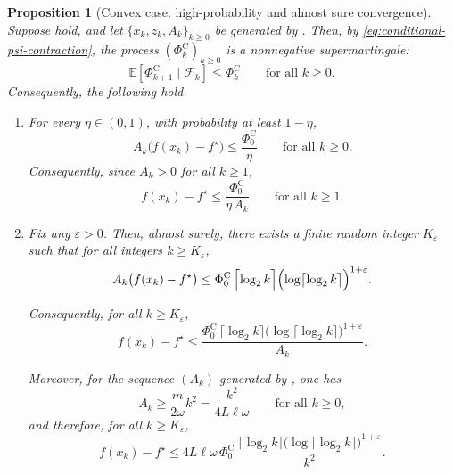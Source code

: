 \documentclass[10pt]{article}
\newtheorem{proposition}[proposition]{Proposition}
\newcommand{\E}{\mathbb{E}}
\begin{document}
\begin{proposition}[Convex case: high-probability and almost sure convergence]
\label{prop:convex-as}
Suppose  hold, and let
\(\{x_k,z_k,A_k\}_{k\ge 0}\) be generated by .
Then, by \eqref{eq:conditional-psi-contraction}, the process
\((\Phi_k^{\mathrm C})_{k\ge 0}\) is a nonnegative supermartingale:
\[
\E[\Phi_{k+1}^{\mathrm C}\mid \mathcal F_k]\le \Phi_k^{\mathrm C}
\qquad\text{for all }k\ge 0.
\]
Consequently, the following hold.

\begin{enumerate}
\item[(i)] For every \(\eta\in(0,1)\), with probability at least \(1-\eta\),
\begin{equation}
\label{eq:convex-hp-AN}
A_k\bigl(f(x_k)-f^\star\bigr)\le \frac{\Phi_0^{\mathrm C}}{\eta}
\qquad\text{for all }k\ge 0.
\end{equation}
Consequently, since \(A_k>0\) for all \(k\ge 1\),
\begin{equation}
\label{eq:convex-hp-gap}
f(x_k)-f^\star\le \frac{\Phi_0^{\mathrm C}}{\eta\,A_k}
\qquad\text{for all }k\ge 1.
\end{equation}

\item[(ii)] Fix any \(\varepsilon>0\).
Then, almost surely, there exists a finite random integer \(K_\varepsilon\) such that for all integers \(k\ge K_\varepsilon\),
\begin{equation}
\label{eq:convex-as-AN}
A_k\bigl(f(x_k)-f^\star\bigr)
\le
\Phi_0^{\mathrm C}\,
\Bigl\lceil \log_2 k \Bigr\rceil
\Bigl(\log \bigl\lceil \log_2 k \bigr\rceil \Bigr)^{1+\varepsilon}.
\end{equation}

Consequently, for all \(k\ge K_\varepsilon\),
\begin{equation}
\label{eq:convex-as-gap}
f(x_k)-f^\star
\le
\frac{
\Phi_0^{\mathrm C}\,
\bigl\lceil \log_2 k \bigr\rceil
\bigl(\log \lceil \log_2 k \rceil \bigr)^{1+\varepsilon}
}{A_k}.
\end{equation}

Moreover, for the sequence \((A_k)\) generated by , one has
\begin{equation}
\label{eq:Ak-lower-convex}
A_k\ge \frac{m}{2\omega}k^2=\frac{k^2}{4L\ell\omega}
\qquad\text{for all }k\ge 0,
\end{equation}
and therefore, for all \(k\ge K_\varepsilon\),
\begin{equation}
\label{eq:convex-as-gap-k2}
f(x_k)-f^\star
\le
4L\ell\omega\,\Phi_0^{\mathrm C}\,
\frac{
\bigl\lceil \log_2 k \bigr\rceil
\bigl(\log \lceil \log_2 k \rceil \bigr)^{1+\varepsilon}
}{k^2}.
\end{equation}
\end{enumerate}
\end{proposition}
\end{document}
